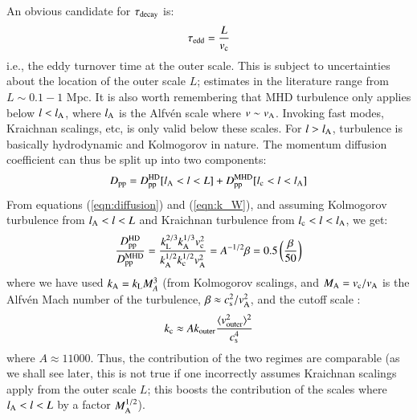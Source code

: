\documentclass[fleqn,usenatbib,useAMS]{mnras}
\begin{document}
An obvious candidate for $\tau_{\rm decay}$ is: 
\begin{equation}
\tau_{\rm edd} = \frac{L}{v_{\rm c}}
\end{equation}
i.e., the eddy turnover time at the outer scale. This is subject to uncertainties about the location of the outer scale $L$; estimates in the literature range from $L \sim 0.1-1$ Mpc. It is also worth remembering that MHD turbulence only applies below $l < l_{\rm A}$, where $l_{\rm A}$ is the Alfv{\'e}n scale where $v \sim v_{\rm A}$. Invoking fast modes, Kraichnan scalings, etc, is only valid below these scales. For $l > l_{\rm A}$, turbulence is basically hydrodynamic and Kolmogorov in nature. The momentum diffusion coefficient can thus be split up into two components: 
\begin{equation}
D_{\rm pp} = D_{\rm pp}^{\rm HD}[l_{\rm A} < l < L] + D_{\rm pp}^{\rm MHD}[l_{\rm c} < l < l_{\rm A}]
\end{equation}
From equations (\ref{eqn:diffusion}) and (\ref{eqn:k_W}), and assuming Kolmogorov turbulence from $l_{\rm A} < l < L$ and Kraichnan turbulence from $l_{\rm c} < l < l_{\rm A}$, we get: 
\begin{equation}
\frac{D_{\rm pp}^{\rm HD}}{D_{\rm pp}^{\rm MHD}} = \frac{k_{\rm L}^{2/3}k_{\rm A}^{1/3} v_{\rm c}^{2}}{k_{\rm A}^{1/2}k_{\rm c}^{1/2} v_{\rm A}^{2}} = A^{-1/2} \beta = 0.5 \left( \frac{\beta}{50} \right) 
\end{equation}
where we have used $k_{\rm A} = k_{\rm L} M_{A}^{3}$ (from Kolmogorov scalings, and $M_{\rm A} = v_{\rm c}/v_{\rm A}$ is the Alfv{\'e}n Mach number of the turbulence, $\beta \approx c_{\rm s}^{2}/v_{\rm A}^{2}$, and the cutoff scale \citep{brunetti07,miniati15}:
\begin{equation}
k_{\rm c} \approx A k_{\rm outer} \frac{\langle v_{\rm outer}^{2}\rangle^{2}}{c_{\rm s}^{4}}
\label{eqn:k_c} 
\end{equation}
where $A \approx 11000$. Thus, the contribution of the two regimes are comparable (as we shall see later, this is not true if one incorrectly assumes Kraichnan scalings apply from the outer scale $L$; this boosts the contribution of the scales where $l_{\rm A} < l < L$ by a factor $M_{\rm A}^{1/2}$). 
\end{document}
